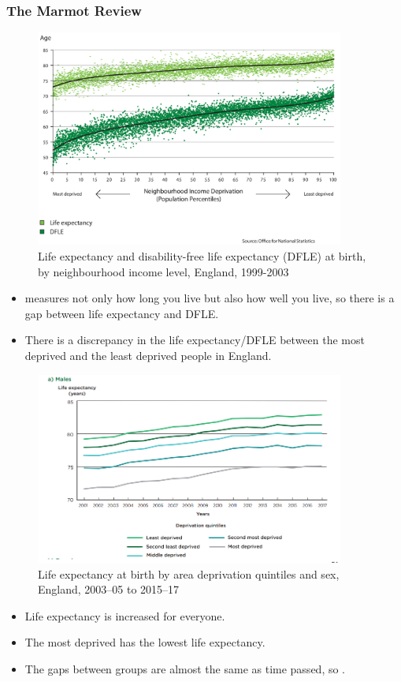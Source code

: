         \subsubsection{The Marmot Review}
            \begin{figure}[H]
                \centering
                \includegraphics[width=4in]{images/ch3/28.png}
                \caption{Life expectancy and disability-free life expectancy (DFLE) at birth, by neighbourhood income level, England, 1999-2003}
            \end{figure}
            \begin{itemize}
                    \item {} measures not only how long you live but also how well you live, so there is a gap between life expectancy and DFLE.
                    \item There is a discrepancy in the life expectancy/DFLE between the most deprived and the least deprived people in England.
            \end{itemize} 
        
            \begin{figure}[H]
                \centering
                \includegraphics[width=4in]{images/ch3/29.png}
                \caption{Life expectancy at birth by area deprivation quintiles and sex, England, 2003–05 to 2015–17}
            \end{figure}
            \begin{itemize}
                \item Life expectancy is increased for everyone.
                \item The most deprived has the lowest life expectancy.
                \item The gaps between groups are almost the same as time passed, so .
            \end{itemize}
        
